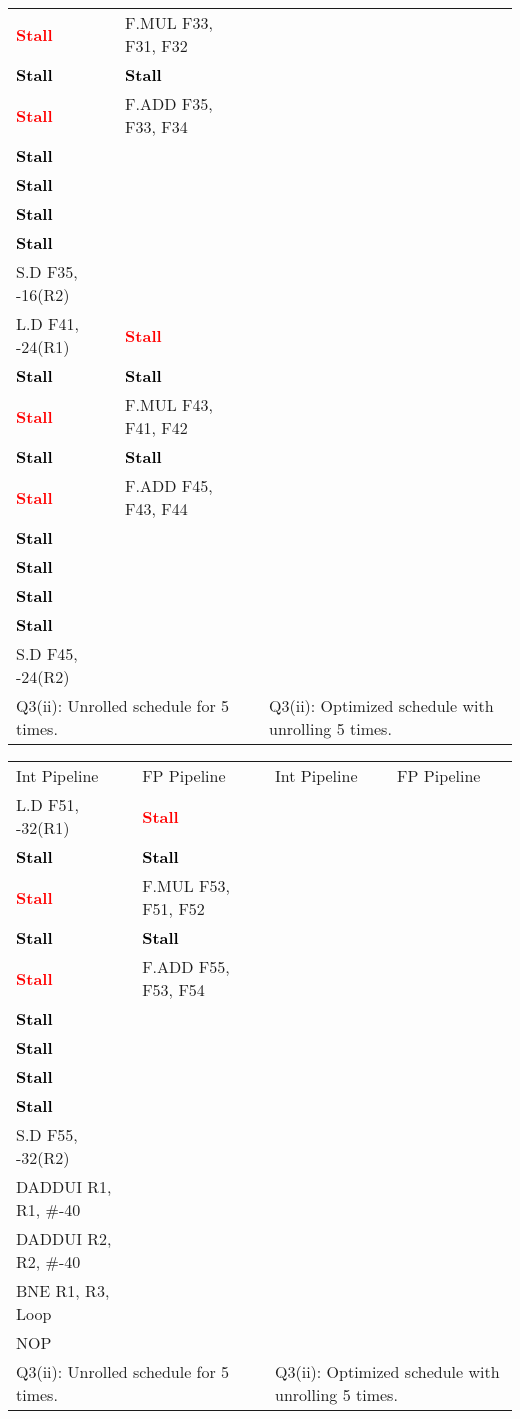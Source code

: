 \documentclass[11pt]{article}
\newcommand{\code}[1]{\textsf{#1}}
\newcommand{\stall}{\textcolor{red}{\textbf{Stall}}}
\newcommand{\cellstall}{\cellcolor{red!25}\textcolor{black}{\textbf{Stall}}}
\begin{document}
\begin{table}[h]
\begin{tabular}{llcll}
	 \stall & \code{F.MUL F33, F31, F32} & &  &  \\ 
	 \cellstall & \cellstall & & & \\
	 \stall & \code{F.ADD F35, F33, F34} & & & \\
	 \cellstall &  & & & \\
	 \cellstall &  &  &  & \\
	 \cellstall &  & &  &  \\
	 \cellstall &  & &   &   \\
	 \code{S.D F35, -16(R2)} &  & &  &  \\ 
	 \code{L.D F41, -24(R1)} & \stall & & & \\	
	 \cellstall & \cellstall & & & \\
	 \stall & \code{F.MUL F43, F41, F42} & & & \\
	 \cellstall & \cellstall & & &  \\
	 \stall & \code{F.ADD F45, F43, F44} & & & \\
	 \cellstall &  & & & \\
	 \cellstall &  &  &  & \\
	 \cellstall &  & &  &  \\
	 \cellstall &  & &   &   \\
	 \code{S.D F45, -24(R2)} &  & &  &  \\  
	 \multicolumn{2}{l}{Q3(ii): Unrolled schedule for 5 times.} & & \multicolumn{2}{l}{Q3(ii): Optimized schedule with unrolling 5 times.} 
\end{tabular}
\label{tbl:q3-p1-1}
\end{table}

\begin{table}[h]
\begin{tabular}{llcll}
	 Int Pipeline & FP Pipeline & & Int Pipeline & FP Pipeline \\ 
	 \code{L.D F51, -32(R1)} & \stall & & & \\	
	 \cellstall & \cellstall & & & \\
	 \stall & \code{F.MUL F53, F51, F52} & & & \\
	 \cellstall & \cellstall & & &  \\
	 \stall & \code{F.ADD F55, F53, F54} & & & \\
	 \cellstall &  & & & \\
	 \cellstall &  &  &  & \\
	 \cellstall &  & &  &  \\
	 \cellstall &  & &   &   \\
	 \code{S.D F55, -32(R2)} &  & &  &  \\ 
	 \code{DADDUI R1, R1, \#-40} &  & &  & \\
	 \code{DADDUI R2, R2, \#-40} &  & &  & \\
	 \code{BNE R1, R3, Loop}  &  & &  &  \\
	 \code{NOP} &  & & & \\
	 \multicolumn{2}{l}{Q3(ii): Unrolled schedule for 5 times.} & & \multicolumn{2}{l}{Q3(ii): Optimized schedule with unrolling 5 times.} 
\end{tabular}
\label{tbl:q3-p1-2}
\end{table}
\end{document}
